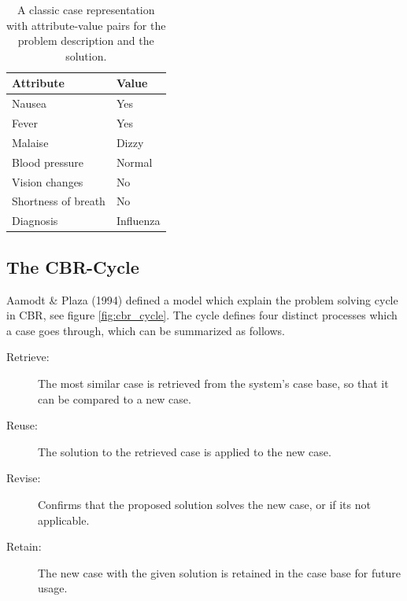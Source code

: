 \begin{table}[H]
\centering
\small
\caption{A classic case representation with attribute-value pairs for the problem description and the solution.}
\label{tab:example_case}
\begin{tabulary}{\textwidth}{|L|L|}
\hline

\textbf{Attribute}           & \textbf{Value}     \\ \hline
Nausea              & Yes       \\ \hline
Fever               & Yes       \\ \hline
Malaise             & Dizzy     \\ \hline
Blood pressure      & Normal    \\ \hline
Vision changes      & No        \\ \hline
Shortness of breath & No        \\ \hline
Diagnosis           & Influenza \\ \hline
\end{tabulary}
\end{table}

\subsection{The CBR-Cycle}\label{sec:cbr-cycle}

Aamodt \& Plaza (1994)\cite{aamodt1994case} defined a model which explain the problem solving cycle in CBR, see figure \ref{fig:cbr_cycle}. The cycle defines four distinct processes which a case goes through, which can be summarized as follows.

\begin{description}
\item [Retrieve:] The most similar case is retrieved from the system's case base, so that it can be compared to a new case.
\item [Reuse:] The solution to the retrieved case is applied to the new case.
\item [Revise:] Confirms that the proposed solution solves the new case, or if its not applicable.
\item [Retain:] The new case with the given solution is retained in the case base for future usage.
\end{description}

